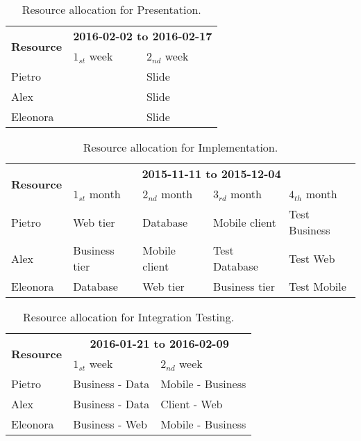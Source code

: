 \begin{table}
    \centering
    \begin{tabular}{| l | l | l |}
        \hline
        \multirow{2}{*}{\textbf{Resource}} & \multicolumn{2}{c|}{\textbf{2016-02-02 to 2016-02-17}} \\
        \cline{2-3}
        & $1_{st}$ week & $2_{nd}$ week \\
        \hline
        Pietro        &     & Slide      \\
        Alex         &     & Slide    \\
        Eleonora        &     & Slide    \\
        \hline
    \end{tabular}
    \caption{Resource allocation for Presentation.}
    \label{tab:presentation-alloc}
\end{table}


\begin{table}
    \centering
    \begin{tabular}{| l | l | l | l | l |}
        \hline
        \multirow{2}{*}{\textbf{Resource}} & \multicolumn{4}{c|}{\textbf{2015-11-11 to 2015-12-04}} \\
        \cline{2-5}
        & $1_{st}$ month & $2_{nd}$ month & $3_{rd} $ month & $4_{th}$ month\\
        \hline
        Pietro        & Web tier    & Database     & Mobile client & Test Business    \\
        Alex         & Business tier     & Mobile client     & Test Database & Test Web   \\
        Eleonora        & Database    & Web tier     & Business tier &    Test Mobile  \\
        \hline
    \end{tabular}
    \caption{Resource allocation for Implementation.}
    \label{tab:implementation-alloc}
\end{table}

\begin{table}
    \centering
    \begin{tabular}{| l | l | l |}
        \hline
        \multirow{2}{*}{\textbf{Resource}} & \multicolumn{2}{c|}{\textbf{2016-01-21 to 2016-02-09}} \\
        \cline{2-3}
        & $1_{st}$ week & $2_{nd}$ week \\
        \hline
        Pietro        &   Business - Data  & Mobile - Business     \\
        Alex         &   Business - Data  & Client - Web    \\
        Eleonora        &   Business - Web  & Mobile - Business    \\
        \hline
    \end{tabular}
    \caption{Resource allocation for Integration Testing.}
    \label{tab:int-test-alloc}
\end{table}
